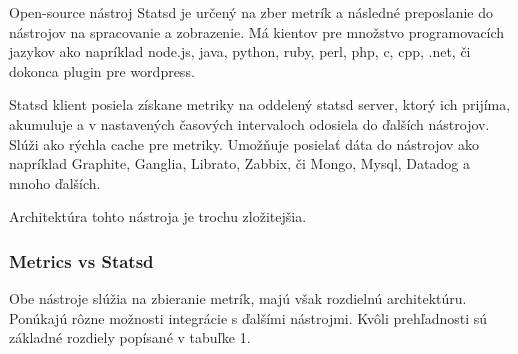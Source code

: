 \documentclass[a4paper, usesections, upjsfrontpage, disablespecwarning, thesismargins, thesislinespacing]{rnthesissvk}
\begin{document}
\noindent
Open-source nástroj Statsd je určený na zber metrík a následné preposlanie do nástrojov na spracovanie a zobrazenie.
Má kientov pre množstvo programovacích jazykov ako napríklad node.js, java, python, ruby, perl, php, c, cpp, .net, či dokonca plugin pre wordpress. 

Statsd klient posiela získane metriky na oddelený statsd server, ktorý ich prijíma, akumuluje a v nastavených časových intervaloch odosiela do ďalších nástrojov. 
Slúži ako rýchla cache pre metriky. 
Umožňuje posielať dáta do nástrojov ako napríklad Graphite, Ganglia, Librato, Zabbix, či Mongo, Mysql, Datadog a mnoho ďalších.

Architektúra tohto nástroja je trochu zložitejšia.


\subsubsection{Metrics vs Statsd}


\noindent
Obe nástroje slúžia na zbieranie metrík, majú však rozdielnú architektúru. 
Ponúkajú rôzne možnosti integrácie s ďalšími nástrojmi. 
Kvôli prehľadnosti sú základné rozdiely popísané v tabuľke 1.
\end{document}
